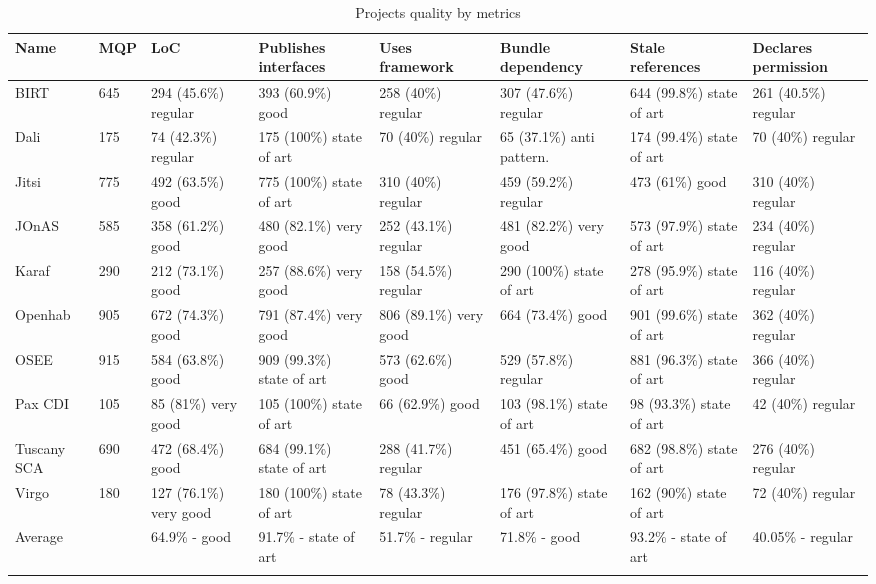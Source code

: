 \begin{table}[h]
\tiny
\caption{Projects quality by metrics}
\label{projects-metrics-quality}
    \begin{tabular}{  p{} | p{1cm} | p{2cm} | p{2cm} | p{2cm} | p{2cm} | p{2cm} | p{2cm} }
    \Xhline{2\arrayrulewidth}
    Name & MQP & LoC & Publishes interfaces & Uses framework & Bundle dependency & Stale references & Declares permission \\  \hline
    BIRT & 645 & 294 (45.6\%) regular & 393 (60.9\%) good& 258 (40\%) regular& 307 (47.6\%) regular& 644 (99.8\%) state of art & 261 (40.5\%) regular\\ \hline
    Dali & 175 & 74 (42.3\%) regular & 175 (100\%) state of art& 70 (40\%) regular & 65 (37.1\%) anti pattern. & 174 (99.4\%) state of art& 70 (40\%) regular\\ \hline
    Jitsi & 775 & 492 (63.5\%) good & 775 (100\%) state of art& 310 (40\%) regular& 459 (59.2\%) regular& 473 (61\%) good& 310 (40\%) regular\\ \hline
    JOnAS & 585 & 358 (61.2\%) good & 480 (82.1\%) very good& 252 (43.1\%) regular& 481 (82.2\%) very good& 573 (97.9\%) state of art& 234 (40\%) regular\\ \hline
    Karaf & 290 & 212 (73.1\%) good & 257 (88.6\%) very good& 158 (54.5\%) regular&  290 (100\%) state of art& 278 (95.9\%) state of art& 116 (40\%) regular\\ \hline
    Openhab & 905 & 672 (74.3\%) good& 791 (87.4\%) very good& 806 (89.1\%) very good&  664 (73.4\%) good& 901 (99.6\%) state of art& 362 (40\%) regular\\ \hline
    OSEE & 915 & 584 (63.8\%) good& 909 (99.3\%) state of art& 573 (62.6\%) good& 529 (57.8\%) regular& 881 (96.3\%) state of art& 366 (40\%) regular\\ \hline
    Pax CDI & 105 & 85 (81\%) very good & 105 (100\%) state of art & 66 (62.9\%) good& 103 (98.1\%) state of art & 98 (93.3\%) state of art& 42 (40\%) regular\\ \hline
    Tuscany SCA & 690 & 472 (68.4\%) good& 684 (99.1\%) state of art & 288 (41.7\%) regular& 451 (65.4\%) good&  682 (98.8\%) state of art& 276 (40\%) regular\\ \hline
    Virgo & 180 & 127 (76.1\%) very good& 180 (100\%) state of art & 78 (43.3\%) regular & 176 (97.8\%) state of art& 162 (90\%) state of art & 72 (40\%) regular\\ \hline
    Average  & & 64.9\% - good & 91.7\% - state of art & 51.7\% - regular  & 71.8\% - good & 93.2\% - state of art & 40.05\% - regular\\
   \Xhline{2\arrayrulewidth}
    \end{tabular}
\end{table}
\FloatBarrier   

